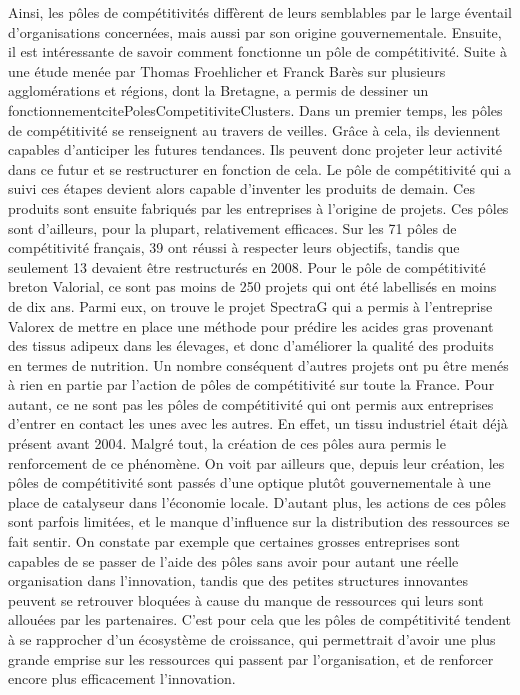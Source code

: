 \documentclass[a4paper,12pt]{report}
\begin{document}
		Ainsi, les pôles de compétitivités diffèrent de leurs semblables par le large éventail d’organisations concernées, mais aussi par son origine gouvernementale.
		Ensuite, il est intéressante de savoir comment fonctionne un pôle de compétitivité. Suite à une étude menée par Thomas Froehlicher et Franck Barès sur plusieurs agglomérations et régions, dont la Bretagne, a permis de dessiner un fonctionnementcite{PolesCompetitiviteClusters}. Dans un premier temps, les pôles de compétitivité se renseignent au travers de veilles. Grâce à cela, ils deviennent capables d’anticiper les futures tendances. Ils peuvent donc projeter leur activité dans ce futur et se restructurer en fonction de cela. Le pôle de compétitivité qui a suivi ces étapes devient alors capable d’inventer les produits de demain. Ces produits sont ensuite fabriqués par les entreprises à l’origine de projets.
		Ces pôles sont d’ailleurs, pour la plupart, relativement efficaces. Sur les 71 pôles de compétitivité français, 39 ont réussi à respecter leurs objectifs, tandis que seulement 13 devaient être restructurés en 2008\cite{PolesCompetitiviteClusters}. Pour le pôle de compétitivité breton Valorial, ce sont pas moins de 250 projets qui ont été labellisés en moins de dix ans\cite{ProjetsValorial}. Parmi eux, on trouve le projet SpectraG qui a permis à l’entreprise Valorex de mettre en place une méthode pour prédire les acides gras provenant des tissus adipeux dans les élevages, et donc d’améliorer la qualité des produits en termes de nutrition\cite{ProjetsAboutis}. Un nombre conséquent d’autres projets ont pu être menés à rien en partie par l’action de pôles de compétitivité sur toute la France.
		Pour autant, ce ne sont pas les pôles de compétitivité qui ont permis aux entreprises d’entrer en contact les unes avec les autres. En effet, un tissu industriel était déjà présent avant 2004. Malgré tout, la création de ces pôles aura permis le renforcement de ce phénomène. On voit par ailleurs que, depuis leur création, les pôles de compétitivité sont passés d’une optique plutôt gouvernementale à une place de catalyseur dans l’économie locale.
		D’autant plus, les actions de ces pôles sont parfois limitées, et le manque d’influence sur la distribution des ressources se fait sentir. On constate par exemple que certaines grosses entreprises sont capables de se passer de l’aide des pôles sans avoir pour autant une réelle organisation dans l’innovation, tandis que des petites structures innovantes peuvent se retrouver bloquées à cause du manque de ressources qui leurs sont allouées par les partenaires.
		C’est pour cela que les pôles de compétitivité tendent à se rapprocher d’un écosystème de croissance, qui permettrait d’avoir une plus grande emprise sur les ressources qui passent par l’organisation, et de renforcer encore plus efficacement l’innovation.
		
\end{document}
